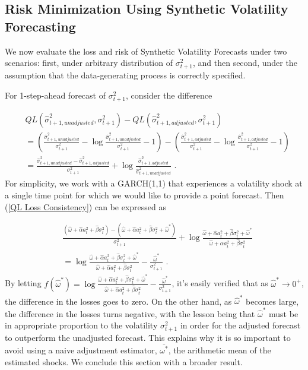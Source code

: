 \documentclass[11pt]{article}
\theoremstyle{definition}
\begin{document}
\subsection{Risk Minimization Using Synthetic Volatility Forecasting}

We now evaluate the loss and risk of Synthetic Volatility Forecasts under two scenarios: first, under arbitrary distribution of $\sigma^{2}_{t+1}$, and then second, under the assumption that the data-generating process is correctly specified.

For 1-step-ahead forecast of $\sigma^{2}_{t+1}$, consider the difference 

\begin{align*}
  & QL(\hat\sigma_{t+1, unadjusted}^{2},\sigma^{2}_{t+1})-QL(\hat\sigma^{2}_{t+1, adjusted},\sigma^{2}_{t+1})\\
   & =(\frac{\hat\sigma^{2}_{t+1,unadjusted}}{\sigma_{t+1}^{2}} - \log{\frac{\hat\sigma^{2}_{t+1,unadjusted}}{\sigma_{t+1}^{2}}} - 1) - (\frac{\hat\sigma^{2}_{t+1,adjusted}}{\sigma_{t+1}^{2}} - \log{\frac{\hat\sigma^{2}_{t+1,adjusted}}{\sigma_{t+1}^{2}}} - 1)\\
   & = \frac{\hat\sigma^{2}_{t+1,unadjusted}-\hat\sigma^{2}_{t+1,adjusted}}{\sigma_{t+1}^{2}} + \log{\frac{\hat\sigma^{2}_{t+1,adjusted}}{\hat\sigma^{2}_{t+1,unadjusted}}}\label{QL Loss Consistency} \text{ .}
\end{align*}
For simplicity, we work with a GARCH(1,1) that experiences a volatility shock at a single time point for which we would like to provide a point forecast.  Then (\ref{QL Loss Consistency}) can be expressed as

\begin{align}
   &\frac{(\hat\omega + \hat\alpha a_{t}^{2} + \hat\beta\sigma^{2}_{t})-(\hat\omega + \hat\alpha a_{t}^{2} + \hat\beta\sigma_{t}^{2} + \hat\omega^{*})}{\sigma_{t+1}^{2}} + \log{\frac{\hat\omega + \hat\alpha a_{t}^{2} + \hat\beta\sigma_{t}^{2} + \hat\omega^{*}}{\hat\omega + \hat\alpha a_{t}^{2} + \hat\beta\sigma_{t}^{2}}}\\
   & = \log{\frac{\hat\omega + \hat\alpha a_{t}^{2} + \hat\beta\sigma_{t}^{2} + \hat\omega^{*}}{\hat\omega + \hat\alpha a_{t}^{2} + \hat\beta\sigma_{t}^{2}}} - \frac{\hat\omega^{*}}{\sigma^{2}_{t+1}} \label{QL Loss Consistency - GARCH(1,1)} \text{ .}
\end{align}
By letting $f(\hat\omega^{*}) = \log{\frac{\hat\omega + \hat\alpha a_{t}^{2} + \hat\beta\sigma_{t}^{2} + \hat\omega^{*}}{\hat\omega + \hat\alpha a_{t}^{2} + \hat\beta\sigma_{t}^{2}}} - \frac{\hat\omega^{*}}{\sigma^{2}_{t+1}}$, it's easily verified that as $\hat\omega^{*} \rightarrow 0^{+}$, the difference in the losses goes to zero.  On the other hand, as $\hat\omega^{*}$ becomes large, the difference in the losses turns negative, with the lesson being that $\hat\omega^{*}$ must be in appropriate proportion to the volatility $\sigma^{2}_{t+1}$ in order for the adjusted forecast to outperform the unadjusted forecast.  This explains why it is so important to avoid using a naive adjustment estimator, $\overline{\omega^{*}}$, the arithmetic mean of the estimated shocks.  We conclude this section with a broader result. 
\end{document}
